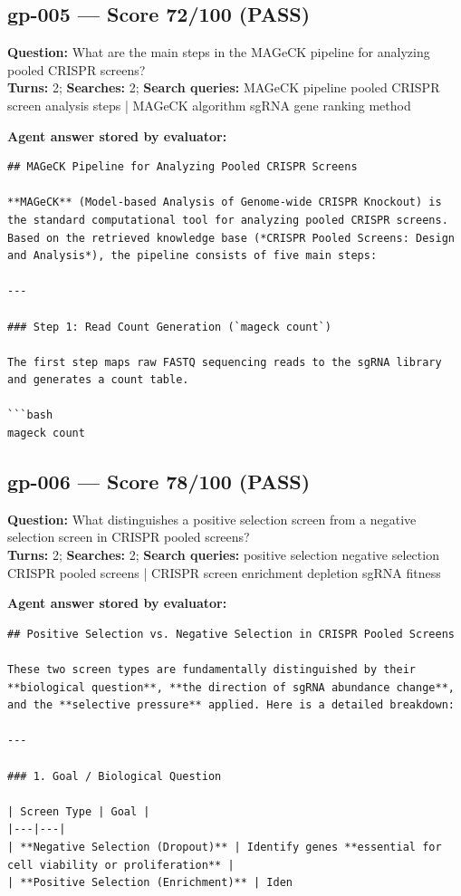 \documentclass[12pt, a4paper]{article}
\begin{document}
\subsection*{gp-005 --- Score 72/100 (PASS)}
\noindent\textbf{Question:} What are the main steps in the MAGeCK pipeline for analyzing pooled CRISPR screens?\\
\textbf{Turns:} 2; \textbf{Searches:} 2; \textbf{Search queries:} MAGeCK pipeline pooled CRISPR screen analysis steps | MAGeCK algorithm sgRNA gene ranking method

\noindent\textbf{Agent answer stored by evaluator:}
\begin{lstlisting}[numbers=none]
## MAGeCK Pipeline for Analyzing Pooled CRISPR Screens

**MAGeCK** (Model-based Analysis of Genome-wide CRISPR Knockout) is the standard computational tool for analyzing pooled CRISPR screens. Based on the retrieved knowledge base (*CRISPR Pooled Screens: Design and Analysis*), the pipeline consists of five main steps:

---

### Step 1: Read Count Generation (`mageck count`)

The first step maps raw FASTQ sequencing reads to the sgRNA library and generates a count table.

```bash
mageck count
\end{lstlisting}

\subsection*{gp-006 --- Score 78/100 (PASS)}
\noindent\textbf{Question:} What distinguishes a positive selection screen from a negative selection screen in CRISPR pooled screens?\\
\textbf{Turns:} 2; \textbf{Searches:} 2; \textbf{Search queries:} positive selection negative selection CRISPR pooled screens | CRISPR screen enrichment depletion sgRNA fitness

\noindent\textbf{Agent answer stored by evaluator:}
\begin{lstlisting}[numbers=none]
## Positive Selection vs. Negative Selection in CRISPR Pooled Screens

These two screen types are fundamentally distinguished by their **biological question**, **the direction of sgRNA abundance change**, and the **selective pressure** applied. Here is a detailed breakdown:

---

### 1. Goal / Biological Question

| Screen Type | Goal |
|---|---|
| **Negative Selection (Dropout)** | Identify genes **essential for cell viability or proliferation** |
| **Positive Selection (Enrichment)** | Iden
\end{lstlisting}
\end{document}
